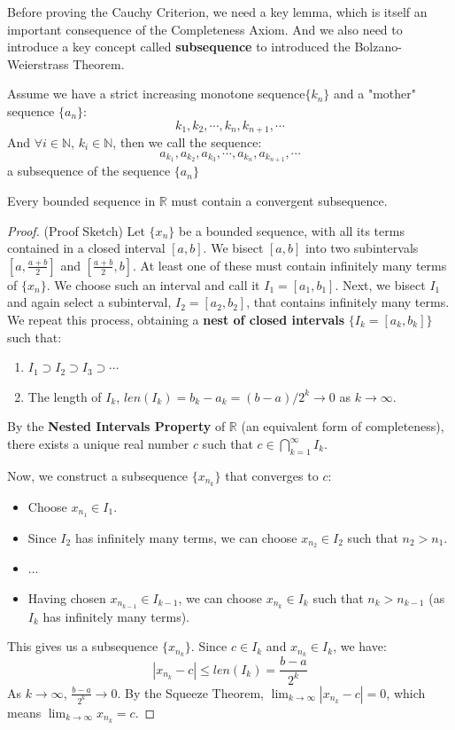 \documentclass[oneside]{book}
\begin{document}
Before proving the Cauchy Criterion, we need a key lemma, which is itself an important consequence of the Completeness Axiom. And we also need to introduce a key concept called \textbf{subsequence} to introduced the Bolzano- Weierstrass Theorem.

\begin{definition}[Subsequence]
    Assume we have a strict increasing monotone sequence$\{k_n\}$ and a "mother" sequence $\{a_n\}$:
    \[
    k_1, k_2, \cdots, k_n, k_{n+1}, \cdots
    \]
    And $\forall i \in \mathbb{N}$, $k_i \in \mathbb{N}$, then we call the sequence:
    \[
    a_{k_1}, a_{k_2}, a_{k_3}, \cdots , a_{k_n}, a_{k_{n+1}}, \cdots
    \]
    a subsequence of the sequence $\{a_n\}$
\end{definition}

\begin{theorem}
\label{thm:bw_en}
Every bounded sequence in $\mathbb{R}$ must contain a convergent subsequence.
\end{theorem}

\begin{proof}
(Proof Sketch) Let $\{x_n\}$ be a bounded sequence, with all its terms contained in a closed interval $[a, b]$.
We bisect $[a, b]$ into two subintervals $[a, \frac{a+b}{2}]$ and $[\frac{a+b}{2}, b]$. At least one of these must contain infinitely many terms of $\{x_n\}$. We choose such an interval and call it $I_1 = [a_1, b_1]$.
Next, we bisect $I_1$ and again select a subinterval, $I_2 = [a_2, b_2]$, that contains infinitely many terms.
We repeat this process, obtaining a \textbf{nest of closed intervals} $\{I_k = [a_k, b_k]\}$ such that:
\begin{enumerate}
    \item $I_1 \supset I_2 \supset I_3 \supset \cdots$
    \item The length of $I_k$, $len(I_k) = b_k - a_k = (b-a)/2^k \to 0$ as $k \to \infty$.
\end{enumerate}
By the \textbf{Nested Intervals Property} of $\mathbb{R}$ (an equivalent form of completeness), there exists a unique real number $c$ such that $c \in \bigcap_{k=1}^\infty I_k$.

Now, we construct a subsequence $\{x_{n_k}\}$ that converges to $c$:
\begin{itemize}
    \item Choose $x_{n_1} \in I_1$.
    \item Since $I_2$ has infinitely many terms, we can choose $x_{n_2} \in I_2$ such that $n_2 > n_1$.
    \item ...
    \item Having chosen $x_{n_{k-1}} \in I_{k-1}$, we can choose $x_{n_k} \in I_k$ such that $n_k > n_{k-1}$ (as $I_k$ has infinitely many terms).
\end{itemize}
This gives us a subsequence $\{x_{n_k}\}$. Since $c \in I_k$ and $x_{n_k} \in I_k$, we have:
\[
|x_{n_k} - c| \leq len(I_k) = \frac{b-a}{2^k}
\]
As $k \to \infty$, $\frac{b-a}{2^k} \to 0$. By the Squeeze Theorem, $\lim_{k \to \infty} |x_{n_k} - c| = 0$, which means $\lim_{k \to \infty} x_{n_k} = c$.
\end{proof}
\end{document}
